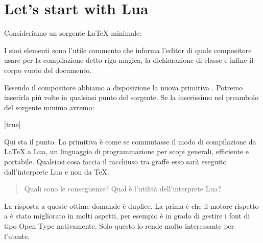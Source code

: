 

\chapter{Let's start with Lua}
\label{iChStart}

Consideriamo un sorgente \LaTeX{} minimale:

I suoi elementi sono l'utile commento che informa l'editor di quale compositore
usare per la compilazione detto riga magica, la dichiarazione di classe e infine
il corpo vuoto del documento.

Essendo il compositore \LuaLaTeX{} abbiamo a disposizione la nuova primitiva
. Potremo inserirla più volte in qualsiasi punto del sorgente. Se
la inserissimo nel preambolo del sorgente minimo avremo:

[true]%
%
%

Qui sta il punto. La primitiva  è come se commutasse il modo di
compilazione da \LaTeX{} a Lua, un linguaggio di programmazione per scopi
generali, efficiente e portabile. Qualsiasi cosa faccia il 
racchiuso tra graffe esso sarà eseguito dall'interprete Lua e non da \TeX.

\begin{quotation}
Quali sono le conseguenze? Qual è l'utilità dell'interprete Lua?
\end{quotation}

%
La risposta a queste ottime domande è duplice. La prima è che il motore
 rispetto a  è stato migliorato in molti aspetti, per
esempio è in grado di gestire i font di tipo Open Type nativamente. Solo questo
lo rende molto interessante per l'utente.

